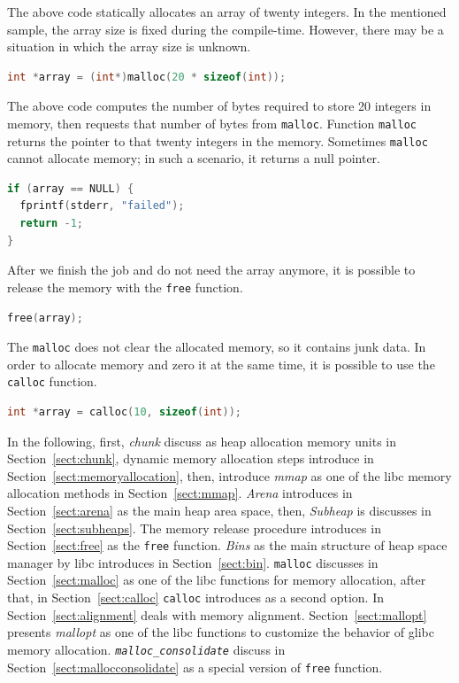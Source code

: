 \documentclass{masterthesis}
\newcommand*\libc{glibc}
\newcommand*\mallocc{\lstinline{malloc}\xspace}
\newcommand*\callocc{\lstinline{calloc}\xspace}
\newcommand{\refToSection}[1]{Section~\ref{sect:#1}\xspace}
\begin{document}
The above code statically allocates an array of twenty integers. In the mentioned sample, the array size is fixed during the compile-time. However, there may be a situation in which the array size is unknown.
\begin{lstlisting}[language=c,frame=tlrb]
int *array = (int*)malloc(20 * sizeof(int));
\end{lstlisting}
The above code computes the number of bytes required to store 20 integers in memory, then requests that number of bytes from \mallocc{}. Function \mallocc{} returns the pointer to that twenty integers in the memory. Sometimes \mallocc{} cannot allocate memory; in such a scenario, it returns a null pointer.
\begin{lstlisting}[language=c,frame=tlrb]
if (array == NULL) {
  fprintf(stderr, "failed");
  return -1;
}
\end{lstlisting}
After we finish the job and do not need the array anymore, it is possible to release the memory with the \lstinline{free} function.
\begin{lstlisting}[language=c,frame=tlrb]
free(array);
\end{lstlisting}
The \mallocc{} does not clear the allocated memory, so it contains junk data. In order to allocate memory and zero it at the same time, it is possible to use the \callocc{} function.
\begin{lstlisting}[language=c,frame=tlrb]
int *array = calloc(10, sizeof(int));
\end{lstlisting}
In the following, first, \emph{chunk} discuss as heap allocation memory units in \refToSection{chunk}, dynamic memory allocation steps introduce in \refToSection{memoryallocation}, then, introduce \emph{mmap} as one of the libc memory allocation methods in \refToSection{mmap}.  \emph{Arena} introduces in \refToSection{arena} as the main heap area space, then, \emph{Subheap} is discusses in \refToSection{subheaps}. The memory release procedure introduces in \refToSection{free} as the \lstinline{free} function. \emph{Bins} as the main structure of heap space manager by libc introduces in \refToSection{bin}. \lstinline{malloc} discusses in \refToSection{malloc}  as one of the libc functions for memory allocation, after that, in \refToSection{calloc} \lstinline{calloc} introduces as a second option.  In \refToSection{alignment} deals with memory alignment. \refToSection{mallopt} presents \emph{mallopt} as one of the libc functions to customize the behavior of \libc{} memory allocation. \emph{\lstinline{malloc_consolidate}} discuss in \refToSection{mallocconsolidate}  as a special version of \lstinline{free} function.
\end{document}
